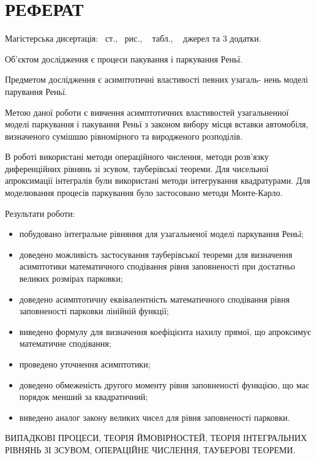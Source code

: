 \chapter*{РЕФЕРАТ}

Магістерська дисертація: \pageref*{MyLastPage}~ст., \totfig~рис., \tottab~ табл., ~ джерел та 3 додатки.

Об'єктом дослідження є процеси пакування і паркування Реньї.

Предметом дослідження є асимптотичні властивості певних узагаль- нень моделі парування Реньї.

Метою даної роботи є вивчення асимптотичних властивостей узагальненної моделі паркування і пакування Реньї з законом вибору місця вставки автомобіля, визначеного сумішшю рівномірного та виродженого розподілів.

В роботі використані методи операційного числення, методи розв'язку диференційних рівнянь зі зсувом, тауберівські теореми. Для чисельної апроксимації інтегралів були використані методи інтегрування квадратурами. Для моделювання процесів паркування було застосовано методи Монте-Карло.

Результати роботи:
\begin{itemize}
	\item побудовано інтегральне рівняння для узагальненої моделі паркування Реньї;
	\item доведено можливість застосування тауберівської теореми для визначення асимптотики математичного сподівання рівня заповненості при достатньо великих розмірах парковки;
	\item доведено асимптотичну еквівалентність математичного сподівання рівня заповненості парковки лінійній функції;
	\item виведено формулу для визначення коефіцієнта нахилу прямої, що апроксимує математичне сподівання;
	\item проведено уточнення асимптотики;
	\item доведено обмеженість другого моменту рівня заповненості функцією, що має порядок менший за квадратичний;
	\item виведено аналог закону великих чисел для рівня заповненості парковки.
\end{itemize}

\MakeUppercase{випадкові процеси, теорія ймовірностей, теорія інтегральних рівнянь зі зсувом, операційне числення, тауберові теореми.} 